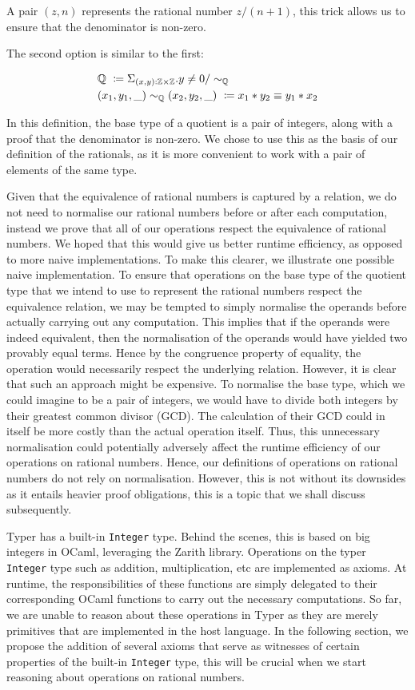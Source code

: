 \documentclass[12pt,twoside,maitrise]{dms}
\theoremstyle{definition}
\numberwithin{equation}{section}
\numberwithin{table}{chapter}
\numberwithin{figure}{chapter}
\newcommand\id[1] {\texttt{#1}}
\begin{document}
A pair $(z , n)$ represents the rational number $z / (n + 1)$, this trick allows us to ensure that the denominator is non-zero.

The second option is similar to the first:

\begin{align*}
  & \mathbb{Q} \ \coloneqq \Sigma_{\oftype{(x, y)}{\mathbb{Z} \times \mathbb{Z}}} . y \ne 0 / \sim_{\mathbb{Q}} \\
  & (x_1 , y_1, \_) \sim_{\mathbb{Q}} (x_2 , y_2, \_) \ \coloneqq x_1 * y_2 \equiv y_1 * x_2
\end{align*}

In this definition, the base type of a quotient is a pair of integers, along
with a proof that the denominator is non-zero. We chose to use this as the basis
of our definition of the rationals, as it is more convenient to work with a pair
of elements of the same type.

Given that the equivalence of rational numbers is captured by a relation, we do
not need to normalise our rational numbers before or after each computation,
instead we prove that all of our operations respect the equivalence of rational
numbers. We hoped that this would give us better runtime efficiency, as opposed
to more naive implementations. To make this clearer, we illustrate one possible
naive implementation. To ensure that operations on the base type of the quotient
type that we intend to use to represent the rational numbers respect the
equivalence relation, we may be tempted to simply normalise the operands before
actually carrying out any computation. This implies that if the operands were
indeed equivalent, then the normalisation of the operands would have yielded two
provably equal terms. Hence by the congruence property of equality, the
operation would necessarily respect the underlying relation. However, it is
clear that such an approach might be expensive. To normalise the base type,
which we could imagine to be a pair of integers, we would have to divide both
integers by their greatest common divisor (GCD). The calculation of their GCD
could in itself be more costly than the actual operation itself. Thus, this
unnecessary normalisation could potentially adversely affect the runtime
efficiency of our operations on rational numbers. Hence, our definitions of
operations on rational numbers do not rely on normalisation. However, this
is not without its downsides as it entails heavier proof obligations, this is a
topic that we shall discuss subsequently.

Typer has a built-in \id{Integer} type. Behind the scenes, this is based on big
integers in OCaml, leveraging the Zarith library. Operations on the typer
\id{Integer} type such as addition, multiplication, etc are implemented as
axioms. At runtime, the responsibilities of these functions are simply delegated
to their corresponding OCaml functions to carry out the necessary computations.
So far, we are unable to reason about these operations in Typer as they are
merely primitives that are implemented in the host language. In the following
section, we propose the addition of several axioms that serve as witnesses of
certain properties of the built-in \id{Integer} type, this will be crucial when
we start reasoning about operations on rational numbers.
\end{document}
